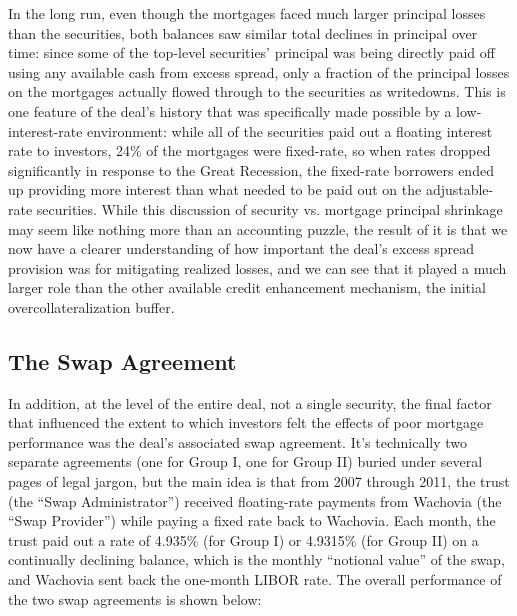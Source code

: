 \documentclass[12pt]{article}
\begin{document}
In the long run, even though the mortgages faced much larger principal losses than the securities, both balances saw similar total declines in principal over time: since some of the top-level securities’ principal was being directly paid off using any available cash from excess spread, only a fraction of the principal losses on the mortgages actually flowed through to the securities as writedowns. This is one feature of the deal’s history that was specifically made possible by a low-interest-rate environment: while all of the securities paid out a floating interest rate to investors, 24\% of the mortgages were fixed-rate, so when rates dropped significantly in response to the Great Recession, the fixed-rate borrowers ended up providing more interest than what needed to be paid out on the adjustable-rate securities. While this discussion of security vs. mortgage principal shrinkage may seem like nothing more than an accounting puzzle, the result of it is that we now have a clearer understanding of how important the deal’s excess spread provision was for mitigating realized losses, and we can see that it played a much larger role than the other available credit enhancement mechanism, the initial overcollateralization buffer.


\subsection*{The Swap Agreement}

In addition, at the level of the entire deal, not a single security, the final factor that influenced the extent to which investors felt the effects of poor mortgage performance was the deal’s associated swap agreement. It’s technically two separate agreements (one for Group I, one for Group II) buried under several pages of legal jargon, but the main idea is that from 2007 through 2011, the trust (the “Swap Administrator”) received floating-rate payments from Wachovia (the “Swap Provider”) while paying a fixed rate back to Wachovia. Each month, the trust paid out a rate of 4.935\% (for Group I) or 4.9315\% (for Group II) on a continually declining balance, which is the monthly “notional value” of the swap, and Wachovia sent back the one-month LIBOR rate. The overall performance of the two swap agreements is shown below:
\end{document}

